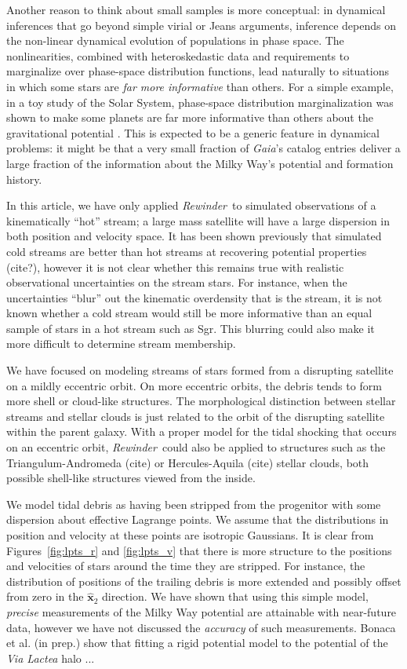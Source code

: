 \documentclass[letterpaper,12pt,preprint]{aastex}
\newcommand{\project}[1]{\textsl{#1}}
\newcommand{\gaia}{\project{Gaia}}
\newcommand{\bs}{\boldsymbol}
\newcommand{\rewinder}{\emph{Rewinder}}
\begin{document}
Another reason to think about small samples is more conceptual:
in dynamical inferences that go beyond simple virial or Jeans arguments,
  inference depends on the non-linear dynamical evolution of populations in phase space.
The nonlinearities, 
  combined with heteroskedastic data and requirements to marginalize over phase-space distribution functions,
  lead naturally to situations in which some stars are \emph{far more informative} than others.
For a simple example, in a toy study of the Solar System,
  phase-space distribution marginalization was shown to make some planets are far more informative than others
  about the gravitational potential \citep{bovy10}.
This is expected to be a generic feature in dynamical problems:
  it might be that a very small fraction of \gaia's catalog entries
  deliver a large fraction of the information about the Milky Way's potential and formation history.

In this article, we have only applied \rewinder\, to simulated observations of a kinematically ``hot'' stream; a large mass satellite will have a large dispersion in both position and velocity space. It has been shown previously that simulated cold streams are better than hot streams at recovering potential properties (cite?), however it is not clear whether this remains true with realistic observational uncertainties on the stream stars. For instance, when the uncertainties ``blur'' out the kinematic overdensity that is the stream, it is not known whether a cold stream would still be more informative than an equal sample of stars in a hot stream such as Sgr. This blurring could also make it more difficult to determine stream membership.

We have focused on modeling streams of stars formed from a disrupting satellite on a mildly eccentric orbit. On more eccentric orbits, the debris tends to form more shell or cloud-like structures. The morphological distinction between stellar streams and stellar clouds is just related to the orbit of the disrupting satellite within the parent galaxy. With a proper model for the tidal shocking that occurs on an eccentric orbit, \rewinder\, could also be applied to structures such as the Triangulum-Andromeda (cite) or Hercules-Aquila (cite) stellar clouds, both possible shell-like structures viewed from the inside.

We model tidal debris as having been stripped from the progenitor with some dispersion about effective Lagrange points. We assume that the distributions in position and velocity at these points are isotropic Gaussians. It is clear from Figures~\ref{fig:lpts_r} and \ref{fig:lpts_v} that there is more structure to the positions and velocities of stars around the time they are stripped. For instance, the distribution of positions of the trailing debris is more extended and possibly offset from zero in the $\hat{\bs{x}}_2$ direction. We have shown that using this simple model, \emph{precise} measurements of the Milky Way potential are attainable with near-future data, however we have not discussed the \emph{accuracy} of such measurements. Bonaca et al. (in prep.) show that fitting a rigid potential model to the potential of the \project{Via Lactea} halo ... %
  
\end{document}
